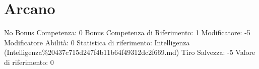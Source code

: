 \section{Arcano}\label{arcano}

\begin{description}
\tightlist
\item[Tags: ABI]
No Bonus Competenza: 0 Bonus Competenza di Riferimento: 1 Modificatore:
-5 Modificatore Abilità: 0 Statistica di riferimento: Intelligenza
(Intelligenza\%20437c715d247f4b11b64f49312dc2f669.md) Tiro Salvezza: -5
Valore di riferimento: 0
\end{description}
